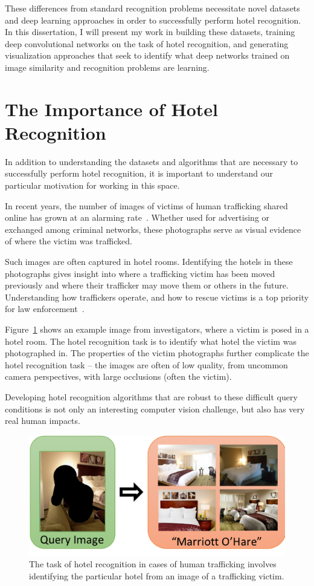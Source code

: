 These differences from standard recognition problems necessitate novel datasets and deep learning approaches in order to successfully perform hotel recognition. In this dissertation, I will present my work in building these datasets, training deep convolutional networks on the task of hotel recognition, and generating visualization approaches that seek to identify what deep networks trained on image similarity and recognition problems are learning.

\section{The Importance of Hotel Recognition}
In addition to understanding the datasets and algorithms that are necessary to successfully perform hotel recognition, it is important to understand our particular motivation for working in this space.

In recent years, the number of images of victims of human trafficking shared online has grown at an alarming rate~\cite{bouche2015report,ncmecAmicusBrief}. Whether used for advertising or exchanged among criminal networks, these photographs serve as visual evidence of where the victim was trafficked.

Such images are often captured in hotel rooms. Identifying the hotels in these photographs gives insight into where a trafficking victim has been moved previously and where their trafficker may move them or others in the future. Understanding how traffickers operate, and how to rescue victims is a top priority for law enforcement~\cite{nationalStrategy}.

Figure~\ref{fig:victimQuery_to_hotel} shows an example image from investigators, where a victim is posed in a hotel room. The hotel recognition task is to identify what hotel the victim was photographed in. The properties of the victim photographs further complicate the hotel recognition task -- the images are often of low quality, from uncommon camera perspectives, with large occlusions (often the victim).

Developing hotel recognition algorithms that are robust to these difficult query conditions is not only an interesting computer vision challenge, but also has very real human impacts.

\begin{figure}
    \centering
    \includegraphics[width=.9\columnwidth]{figures/chapter1/victimQuery_to_hotel.png}
    \caption{The task of hotel recognition in cases of human trafficking involves identifying the particular hotel from an image of a trafficking victim.}
    \label{fig:victimQuery_to_hotel}
\end{figure}